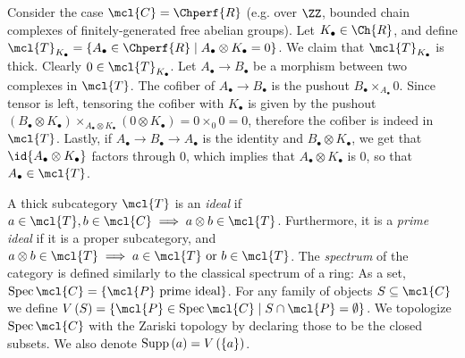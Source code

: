 \begin{example}
	Consider the case $\mcl{C} = \Chperf{R}$ (e.g. over $\ZZ$, bounded chain complexes of finitely-generated free abelian groups).
	Let $K_\bullet \in \Ch{R}$, and define
	$\mcl{T}_{K_\bullet} = \left\{ A_\bullet \in \Chperf{R} \mid A_\bullet \otimes K_\bullet = 0 \right\}$.
	We claim that $\mcl{T}_{K_\bullet}$ is thick.
	Clearly $0 \in \mcl{T}_{K_\bullet}$.
	Let $A_\bullet \to B_\bullet$ be a morphism between two complexes in $\mcl{T}$. The cofiber of $A_\bullet \to B_\bullet$ is the pushout $B_\bullet \times_{A_\bullet} 0$. Since tensor is left, tensoring the cofiber with $K_\bullet$ is given by the pushout
	$\left(B_\bullet \otimes K_\bullet\right) \times_{A_\bullet \otimes K_\bullet} \left(0 \otimes K_\bullet\right) = 0 \times_0 0 = 0$, therefore the cofiber is indeed in $\mcl{T}$.
	Lastly, if $A_\bullet \to B_\bullet \to A_\bullet$ is the identity and $B_\bullet \otimes K_\bullet$, we get that $\id{A_\bullet \otimes K_\bullet}$ factors through $0$, which implies that $A_\bullet \otimes K_\bullet$ is $0$, so that $A_\bullet \in \mcl{T}$.
\end{example}

\begin{definition}
	A thick subcategory $\mcl{T}$ is an \emph{ideal} if $a \in \mcl{T}, b \in \mcl{C} \implies a \otimes b \in \mcl{T}$.
	Furthermore, it is a \emph{prime ideal} if it is a proper subcategory, and $a \otimes b \in \mcl{T} \implies a \in \mcl{T} \textrm{ or } b \in \mcl{T}$.
	The \emph{spectrum} of the category is defined similarly to the classical spectrum of a ring:
	As a set, $\spec \mcl{C} = \left\{ \mcl{P}\textrm{ prime ideal} \right\}$.
	For any family of objects $S \subseteq \mcl{C}$ we define $V\left(S\right) = \left\{ \mcl{P} \in \spec \mcl{C} \mid S \cap \mcl{P} = \emptyset \right\}$.
	We topologize $\spec \mcl{C}$ with the Zariski topology by declaring those to be the closed subsets.
	We also denote $\operatorname{Supp}\left(a\right) = V\left(\left\{ a\right\}\right)$.
\end{definition}

